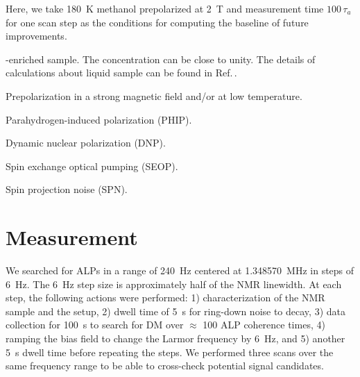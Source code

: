 \documentclass[superscriptaddress,
floatfix,
reprint,
nofootinbib,
amsmath,amssymb,
aps,
prd,
]{revtex4-2}
\begin{document}
\begin{table}
\begin{threeparttable}
\begin{ruledtabular}
\begin{tabular}{p{0.23\linewidth}>{\centering\arraybackslash}p{0.23\linewidth}>{\centering\arraybackslash}p{0.23\linewidth}>{\centering\arraybackslash}p{0.23\linewidth}}
    \end{tabular}
    \end{ruledtabular}
    \begin{tablenotes}
    \footnotesize
    \item[a] Here, we take \SI{180}{\kelvin} methanol prepolarized at \SI{2}{\tesla} and measurement time $100\,\tau_a$ for one scan step as the conditions for computing the baseline of future improvements. 
    \item[b] -enriched sample. The  concentration can be close to unity. The details of calculations about liquid  sample can be found in Ref.\,\cite{kimball2018overview}.
    \item[c] Prepolarization in a strong magnetic field and/or at low temperature. 
    \item[d] Parahydrogen-induced polarization (PHIP). 
    \item[e] Dynamic nuclear polarization (DNP).
    \item[f] Spin exchange optical pumping (SEOP).
    \item[g] Spin projection noise (SPN). 
    \end{tablenotes}
    \end{threeparttable}
\end{table}


\section{Measurement}

We searched for ALPs in a range of \SI{240}{\Hz} centered at \SI{1.348570}{\MHz} in steps of \SI{6}{\Hz}. The \SI{6}{\Hz} step size is approximately half of the NMR linewidth. 
At each step, the following actions were performed:
1) characterization of the NMR sample and the setup, 
2) dwell time of \SI{5}{\s} for ring-down noise to decay,
3) data collection for \SI{100}{\s} to search for DM over $\approx$ 100 ALP coherence times,
4) ramping the bias field to change the Larmor frequency by \SI{6}{\Hz}, and 
5) another \SI{5}{\s} dwell time before repeating the steps. 
We performed three scans over the same frequency range to be able to cross-check potential signal candidates. 
\end{document}
